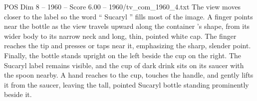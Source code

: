 \begin{textsample}{POS Dim 8 – 1960 – Score 6.00 – 1960/tv\_com\_1960\_4.txt}
The view moves closer to the label so the word “ Sucaryl ” fills most of the image.
A finger points near the bottle as the view travels upward along the container ’s shape, from its wider body to its narrow neck and long, thin, pointed white cap.
The finger reaches the tip and presses or taps near it, emphasizing the sharp, slender point.
Finally, the bottle stands upright on the left beside the cup on the right.
The Sucaryl label remains visible, and the cup of dark drink sits on its saucer with the spoon nearby.
A hand reaches to the cup, touches the handle, and gently lifts it from the saucer, leaving the tall, pointed Sucaryl bottle standing prominently beside it.

\end{textsample}
